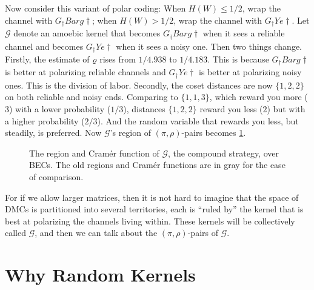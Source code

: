 \documentclass[openany]{amsbook}
\numberwithin{equation}{chapter}
\numberwithin{figure}{chapter}
\numberwithin{table}{chapter}
\def\GY{G_†Ye†}
\def\GB{G_†Barg†}
\theoremstyle{definition}	理dfn:Definition~?s			理exa:Example~?s
\theoremstyle{remark}		理cla:Claim~?s				理rem:Remark~?s
\begin{document}
	Now consider this variant of polar coding:
	When $H(W)≤1/2$, wrap the channel with $\GB$;
	when $H(W)>1/2$, wrap the channel with $\GY$.
	Let $𝒢$ denote an amoebic kernel that becomes $\GB$ when it sees a reliable channel
	and becomes $\GY$ when it sees a noisy one.
	Then two things change.
	Firstly, the estimate of $ϱ$ rises from $1/4.938$ to $1/4.183$.
	This is because $\GB$ is better at polarizing reliable channels
	and $\GY$ is better at polarizing noisy ones.
	This is the division of labor.
	Secondly, the coset distances are now $\{1,2,2\}$ on both reliable and noisy ends.
	Comparing to $\{1,1,3\}$, which reward you more ($3$)
	with a lower probability ($1/3$), distances $\{1,2,2\}$
	reward you less ($2$) but with a higher probability ($2/3$).
	And the random variable that rewards you less, but steadily, is preferred.
	Now $𝒢$'s region of $(π,ρ)$-pairs becomes \cref{fig:dynamic}.
	
	\begin{figure}
		\caption{
			The region and Cramér function of $𝒢$, the compound strategy, over BECs.
			The old regions and Cramér functions are in gray for the ease of comparison.
		}\label{fig:dynamic}
	\end{figure}
	
	For if we allow larger matrices, then it is not hard to imagine that
	the space of DMCs is partitioned into several territories, each is
	“ruled by” the kernel that is best at polarizing the channels living within.
	These kernels will be collectively called $𝒢$,
	and then we can talk about the $(π,ρ)$-pairs of $𝒢$.

\section{Why Random Kernels}
\end{document}
